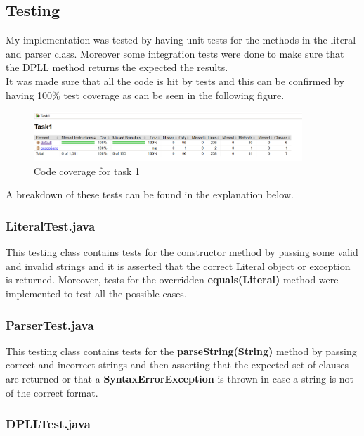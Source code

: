 \documentclass{article}
\begin{document}
		
		\subsection{Testing}
		
	My implementation was tested by having unit tests for the methods in the literal and parser class. Moreover some integration tests were done to make sure that the DPLL method returns the expected the results.\\
	It was made sure that all the code is hit by tests and this can be confirmed by having 100\% test coverage as can be seen in the following figure.
	
		\begin{figure}[H]
					\centering
			 			\includegraphics[width=0.9\textwidth]{task1cov.png}
			 			\centering
			  			\caption{Code coverage for task 1}
			  			\label{fig:task1cov}
					\end{figure}
	
	
	A breakdown of these tests can be found in the explanation below.

	\subsubsection{LiteralTest.java}
	
	This testing class contains tests for the constructor method by passing some valid and invalid strings and it is asserted that the correct Literal object or exception is returned. Moreover, tests for the overridden \textbf{equals(Literal)} method were implemented to test all the possible cases.
	
	\subsubsection{ParserTest.java}
	
	This testing class contains tests for the \textbf{parseString(String)} method by passing correct and incorrect strings and then asserting that the expected set of clauses are returned or that a \textbf{SyntaxErrorException} is thrown in case a string is not of the correct format.
	
	\subsubsection{DPLLTest.java}
	
\end{document}
